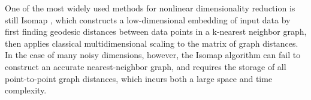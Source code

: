 
One of the most widely used methods
for nonlinear dimensionality reduction
is still  Isomap  \cite{tenenbaum2000global}, which constructs a low-dimensional embedding
of input data by first finding geodesic 
distances between data points 
in a k-nearest neighbor graph, then
applies classical multidimensional scaling to
the matrix of graph distances.
In the case of many noisy dimensions, however,
the Isomap algorithm can fail to construct
an accurate nearest-neighbor graph,
and requires the storage of all point-to-point
graph distances, which incurs both a large space and time complexity.



